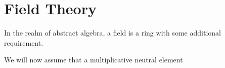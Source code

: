 \section{Field Theory}
In the realm of abstract algebra, a field is a ring with some additional requirement. 

We will now assume that a multiplicative neutral element